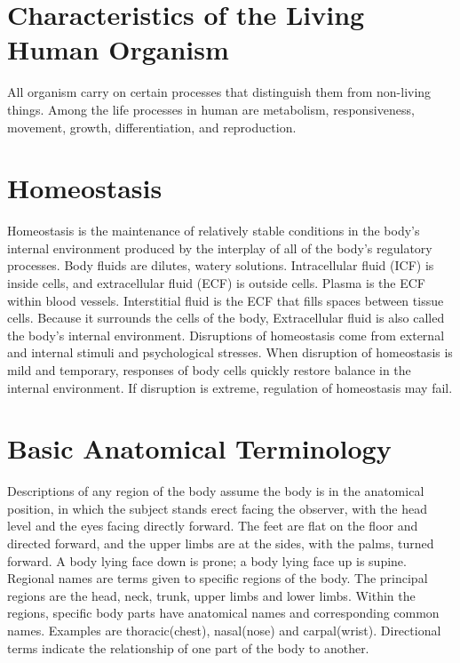 \documentclass[12pt]{article}
\begin{document}
\section{Characteristics of the Living Human Organism}
\hspace{1cm}
All organism carry on certain processes that distinguish them from non-living things. Among the life processes in human are metabolism, responsiveness, movement, growth, differentiation, and reproduction.

\section{Homeostasis}
\hspace{1cm}
Homeostasis is the maintenance of relatively stable conditions in the body's internal environment produced by the interplay of all of the body's regulatory processes. Body fluids are dilutes, watery solutions. Intracellular fluid (ICF) is inside cells, and extracellular fluid (ECF) is outside cells. Plasma is the ECF within blood vessels. Interstitial fluid is the ECF that fills spaces between tissue cells. Because it surrounds the cells of the body, Extracellular fluid is also called the body's internal environment. Disruptions of homeostasis come from external and internal stimuli and psychological stresses. When disruption of homeostasis is mild and temporary, responses of body cells quickly restore balance in the internal environment. If disruption is extreme, regulation of homeostasis may fail.

\section{Basic Anatomical Terminology}
\hspace{1cm}
Descriptions of any region of the body assume the body is in the anatomical position, in which the subject stands erect facing the observer, with the head level and the eyes facing directly forward. The feet are flat on the floor and directed forward, and the upper limbs are at the sides, with the palms, turned forward. A body lying face down is prone; a body lying face up is supine. Regional names are terms given to specific regions of the body. The principal regions are the head, neck, trunk, upper limbs and lower limbs. Within the regions, specific body parts have anatomical names and corresponding common names. Examples are thoracic(chest), nasal(nose) and carpal(wrist). Directional terms indicate the relationship of one part of the body to another. 
\end{document}
